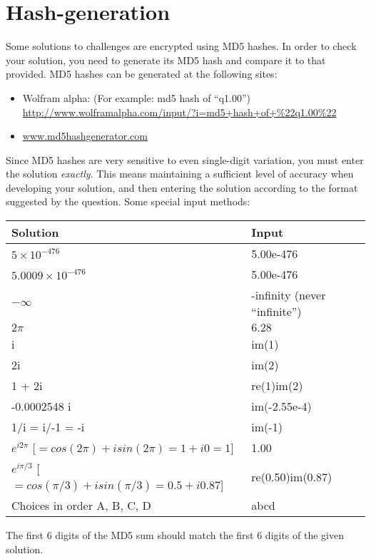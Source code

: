 \newpage
\section{Hash-generation}
\label{sec:hashes}

Some solutions to challenges are encrypted using MD5 hashes. In order to check your solution, you need to generate its MD5 hash and compare it to that provided. MD5 hashes can be generated at the following sites:

\begin{itemize}
    \item Wolfram alpha: (For example: md5 hash of ``q1.00'') \url{http://www.wolframalpha.com/input/?i=md5+hash+of+\%22q1.00\%22}
    \item \url{www.md5hashgenerator.com}
\end{itemize}

Since MD5 hashes are very sensitive to even single-digit variation, you must enter the solution \emph{exactly}. This means maintaining a sufficient level of accuracy when developing your solution, and then entering the solution according to the format suggested by the question. Some special input methods:

\begin{center}
\begin{tabular}{|l|l|}
    \hline
    \textbf{Solution} & \textbf{Input} \\ \hline
    $5 \times 10^{-476}$ & 5.00e-476 \\
    $5.0009 \times 10^{-476}$ & 5.00e-476 \\
    $-\infty$ & -infinity (never ``infinite'')\\
    $2 \pi$ & $6.28$ \\
    i & im(1) \\
    2i & im(2) \\
    1 + 2i & re(1)im(2) \\
    -0.0002548 i & im(-2.55e-4) \\
    1/i = i/-1 = -i & im(-1) \\
    $e^{i2\pi}$ [$= cos(2 \pi) + isin(2 \pi) = 1 + i0 = 1$] & 1.00 \\
    $e^{i\pi/3}$ [$= cos(\pi/3) + isin(\pi/3) = 0.5 + i 0.87$] & re(0.50)im(0.87) \\
    Choices in order A, B, C, D & abcd \\
    \hline
\end{tabular}
\end{center}

The first 6 digits of the MD5 sum should match the first 6 digits of the given solution.
